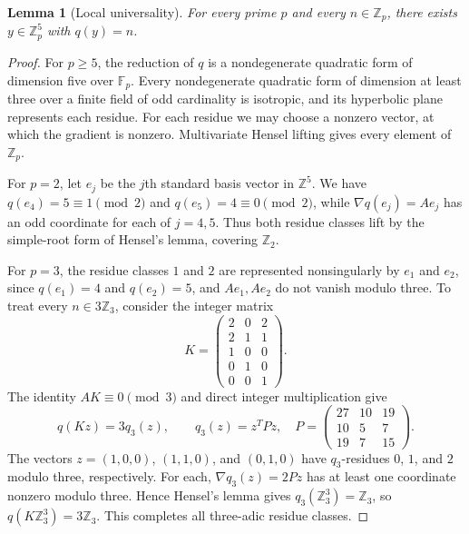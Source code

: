\documentclass[9pt,a4paper,twocolumn]{extarticle}
\newtheorem{lemma}{Lemma}
\begin{document}
\begin{lemma}[Local universality]\label{lem:local}
For every prime $p$ and every $n\in\mathbb Z_p$, there exists $y\in\mathbb Z_p^5$ with $q(y)=n$.
\end{lemma}
\begin{proof}
For $p\geq5$, the reduction of $q$ is a nondegenerate quadratic form of dimension five over $\mathbb F_p$. Every nondegenerate quadratic form of dimension at least three over a finite field of odd cardinality is isotropic, and its hyperbolic plane represents each residue. For each residue we may choose a nonzero vector, at which the gradient is nonzero. Multivariate Hensel lifting gives every element of $\mathbb Z_p$.

For $p=2$, let $e_j$ be the $j$th standard basis vector in $\mathbb Z^5$. We have $q(e_4)=5\equiv1\pmod2$ and $q(e_5)=4\equiv0\pmod2$, while $\nabla q(e_j)=Ae_j$ has an odd coordinate for each of $j=4,5$. Thus both residue classes lift by the simple-root form of Hensel's lemma, covering $\mathbb Z_2$.

For $p=3$, the residue classes $1$ and $2$ are represented nonsingularly by $e_1$ and $e_2$, since $q(e_1)=4$ and $q(e_2)=5$, and $Ae_1,Ae_2$ do not vanish modulo three. To treat every $n\in3\mathbb Z_3$, consider the integer matrix
\begin{equation}\label{eq:K}
K=\begin{pmatrix}
2&0&2\\2&1&1\\1&0&0\\0&1&0\\0&0&1
\end{pmatrix}.
\end{equation}
The identity $AK\equiv0\pmod3$ and direct integer multiplication give
\begin{equation}\label{eq:P}
q(Kz)=3q_3(z),\qquad
q_3(z)=z^T\!Pz,\quad
P=\begin{pmatrix}27&10&19\\10&5&7\\19&7&15\end{pmatrix}.
\end{equation}
The vectors $z=(1,0,0)$, $(1,1,0)$, and $(0,1,0)$ have $q_3$-residues $0$, $1$, and $2$ modulo three, respectively. For each, $\nabla q_3(z)=2Pz$ has at least one coordinate nonzero modulo three. Hence Hensel's lemma gives $q_3(\mathbb Z_3^3)=\mathbb Z_3$, so $q(K\mathbb Z_3^3)=3\mathbb Z_3$. This completes all three-adic residue classes.
\end{proof}
\end{document}
